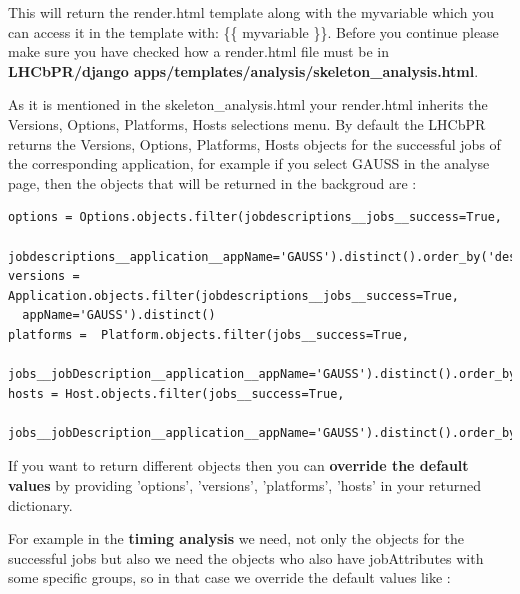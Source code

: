 \documentclass{lhcbnote}
\begin{document}
\vspace{2 mm}

This will return the render.html template along with the myvariable which you can access it in the template with: \{\{ myvariable \}\}. 
Before you continue please make sure you have checked how a render.html file must be in {\bf LHCbPR/django apps/templates/analysis/skeleton\_analysis.html}.

As it is mentioned in the skeleton\_analysis.html your render.html inherits the Versions, Options, Platforms, Hosts selections menu.
By default the LHCbPR returns the Versions, Options, Platforms, Hosts objects for the successful jobs of the corresponding application, for example if you select GAUSS in the analyse 
page, then the objects that will be returned in the backgroud are :

\vspace{2 mm}

\begin{verbatim}
options = Options.objects.filter(jobdescriptions__jobs__success=True,
  jobdescriptions__application__appName='GAUSS').distinct().order_by('description')
versions = Application.objects.filter(jobdescriptions__jobs__success=True, 
  appName='GAUSS').distinct()
platforms =  Platform.objects.filter(jobs__success=True,
  jobs__jobDescription__application__appName='GAUSS').distinct().order_by('cmtconfig')
hosts = Host.objects.filter(jobs__success=True,
  jobs__jobDescription__application__appName='GAUSS').distinct().order_by('hostname')
\end{verbatim}

\vspace{2 mm}

If you want to return different objects then you can {\bf override the default values} by providing 'options', 'versions', 'platforms', 'hosts' in your returned dictionary. 

For example in the {\bf timing analysis} we need, not only the objects for the successful jobs but also we need the objects who also have jobAttributes with some specific groups, so in that
case we override the default values like :
\end{document}
